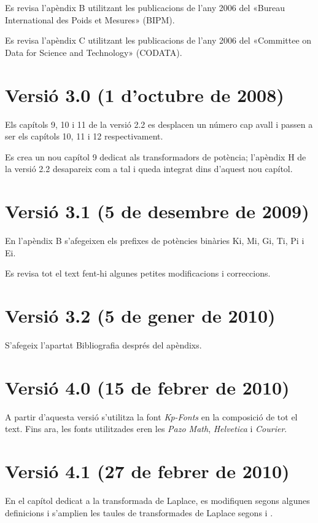 Es revisa l'apèndix B utilitzant les publicacions de l'any 2006 del «Bureau
International des Poids et Mesures» (BIPM).

Es revisa l'apèndix C utilitzant les publicacions de l'any 2006 del «Committee on Data for Science and Technology» (CODATA).

\section*{Versió 3.0 (1 d'octubre de 2008)}

Els capítols 9, 10 i 11 de la versió 2.2 es desplacen un número cap
avall i passen a ser els capítols 10, 11 i 12 respectivament.

Es crea un nou capítol 9 dedicat als transformadors de potència;
l'apèndix H de la versió 2.2 desapareix com a tal i queda integrat
dins d'aquest nou capítol.


\section*{Versió 3.1 (5 de desembre de 2009)}
En l'apèndix B s'afegeixen els prefixes de potències binàries Ki, Mi, Gi, Ti, Pi i Ei.

Es revisa tot el text fent-hi algunes petites modificacions i
correccions.

\section*{Versió 3.2 (5 de gener de 2010)}
S'afegeix l'apartat Bibliografia després del apèndixs.


\section*{Versió 4.0 (15 de febrer de 2010)}
A partir d'aquesta versió s'utilitza la font \emph{Kp-Fonts} en la composició de tot el text. Fins ara, les fonts utilitzades eren les \emph{Pazo Math}, \emph{Helvetica} i \emph{Courier}.


\section*{Versió 4.1 (27 de febrer de 2010)}
En el capítol dedicat a la transformada de Laplace, es modifiquen segons \cite{SCH} algunes definicions  i s'amplien les taules de transformades de Laplace segons \cite{SCH} i \cite{RASd}.

